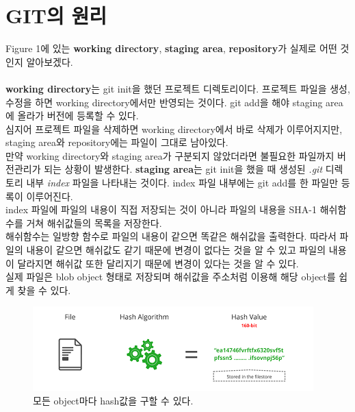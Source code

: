 \documentclass[letterpaper,12pt]{article}
\begin{document}
\section{GIT의 원리}
Figure 1에 있는 \textbf{working directory}, \textbf{staging area}, \textbf{repository}가 실제로 어떤 것인지 알아보겠다.
\\\\\textbf{working directory}는 git init을 했던 프로젝트 디렉토리이다. 프로젝트 파일을 생성, 수정을 하면 working directory에서만 반영되는 것이다. git add을 해야 staging area에 올라가 버전에 등록할 수 있다. 
\\심지어 프로젝트 파일을 삭제하면 working directory에서 바로 삭제가 이루어지지만, staging area와 repository에는 파일이 그대로 남아있다. \\만약 working directory와 staging area가 구분되지 않았더라면 불필요한 파일까지 버전관리가 되는 상황이 발생한다.
\clearpage
\textbf{staging area}는 git init을 했을 때 생성된 \textit{.git} 디렉토리 내부 \textit{index} 파일을 나타내는 것이다. index 파일 내부에는 git add를 한 파일만 등록이 이루어진다. \\index 파일에 파일의 내용이 직접 저장되는 것이 아니라 파일의 내용을 SHA-1 해쉬함수를 거쳐 해쉬값들의 목록을 저장한다. \\해쉬함수는 일방향 함수로 파일의 내용이 같으면 똑같은 해쉬값을 출력한다. 따라서 파일의 내용이 같으면 해쉬값도 같기 때문에 변경이 없다는 것을 알 수 있고 파일의 내용이 달라지면 해쉬값 또한 달리지기 때문에 변경이 있다는 것을 알 수 있다. \\ 실제 파일은 blob object 형태로 저장되며 해쉬값을 주소처럼 이용해 해당 object를 쉽게 찾을 수 있다.
\begin{figure}[ht] 
        \centering \includegraphics[width=0.8\columnwidth]{hash}
         \caption{
                \label{fig:hash}  
                모든 object마다 hash값을 구할 수 있다.
        }
\end{figure}
\end{document}
